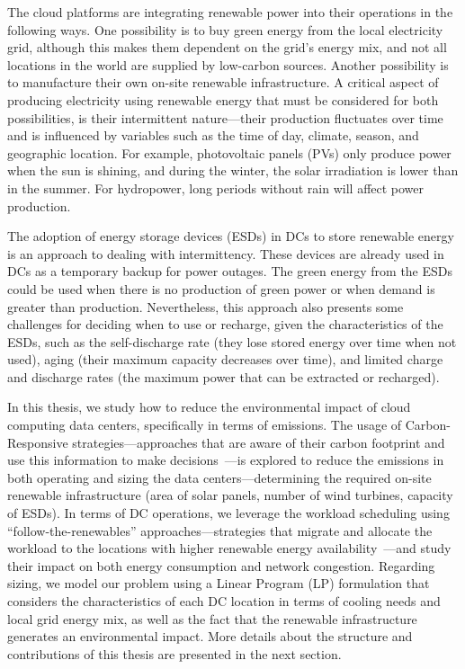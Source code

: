 The cloud platforms are integrating renewable power into their operations in the following ways. One possibility is to buy green energy from the local electricity grid, although this makes them dependent on the grid's energy mix, and not all locations in the world are supplied by low-carbon sources. Another possibility is to manufacture their own on-site renewable infrastructure. A critical aspect of producing electricity using renewable energy that must be considered for both possibilities,  is their intermittent nature---their production fluctuates over time and is influenced by variables such as the time of day, climate, season, and geographic location. For example, photovoltaic panels (PVs) only produce power when the sun is shining, and during the winter, the solar irradiation is lower than in the summer. For hydropower, long periods without rain will affect power production.

The adoption of energy storage devices (ESDs) in DCs to store renewable energy~\cite{wang2012_EDCS} is an approach to dealing with intermittency. These devices are already used in DCs as a temporary backup for power outages. The green energy from the ESDs could be used when there is no production of green power or when demand is greater than production. Nevertheless, this approach also presents some challenges for deciding when to use or recharge, given the characteristics of the ESDs, such as the self-discharge rate (they lose stored energy over time when not used), aging (their maximum capacity decreases over time), and limited charge and discharge rates (the maximum power that can be extracted or recharged).

In this thesis, we study how to reduce the environmental impact of cloud computing data centers, specifically in terms of  emissions. The usage of Carbon-Responsive strategies---approaches that are aware of their carbon footprint and use this information to make decisions~\cite{schooler2021carbonaware}---is explored to reduce the  emissions in both operating and sizing the data centers---determining the required on-site renewable infrastructure (area of solar panels, number of wind turbines, capacity of ESDs). In terms of DC operations, we leverage the workload scheduling using ``follow-the-renewables'' approaches---strategies that migrate and allocate the workload to the locations with higher renewable energy availability~\cite{shuja2016sustainable}---and study their impact on both energy consumption and network congestion. Regarding sizing, we model our problem using a Linear Program (LP) formulation that considers the characteristics of each DC location in terms of cooling needs and local grid energy mix, as well as the fact that the renewable infrastructure generates an environmental impact. More details about the structure and contributions of this thesis are presented in the next section.

